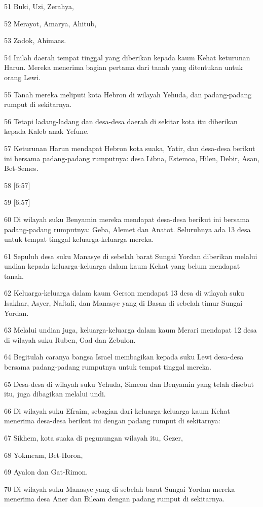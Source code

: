 \par 51 Buki, Uzi, Zerahya,
\par 52 Merayot, Amarya, Ahitub,
\par 53 Zadok, Ahimaas.
\par 54 Inilah daerah tempat tinggal yang diberikan kepada kaum Kehat keturunan Harun. Mereka menerima bagian pertama dari tanah yang ditentukan untuk orang Lewi.
\par 55 Tanah mereka meliputi kota Hebron di wilayah Yehuda, dan padang-padang rumput di sekitarnya.
\par 56 Tetapi ladang-ladang dan desa-desa daerah di sekitar kota itu diberikan kepada Kaleb anak Yefune.
\par 57 Keturunan Harun mendapat Hebron kota suaka, Yatir, dan desa-desa berikut ini bersama padang-padang rumputnya: desa Libna, Estemoa, Hilen, Debir, Asan, Bet-Semes.
\par 58 [6:57]
\par 59 [6:57]
\par 60 Di wilayah suku Benyamin mereka mendapat desa-desa berikut ini bersama padang-padang rumputnya: Geba, Alemet dan Anatot. Seluruhnya ada 13 desa untuk tempat tinggal keluarga-keluarga mereka.
\par 61 Sepuluh desa suku Manasye di sebelah barat Sungai Yordan diberikan melalui undian kepada keluarga-keluarga dalam kaum Kehat yang belum mendapat tanah.
\par 62 Keluarga-keluarga dalam kaum Gerson mendapat 13 desa di wilayah suku Isakhar, Asyer, Naftali, dan Manasye yang di Basan di sebelah timur Sungai Yordan.
\par 63 Melalui undian juga, keluarga-keluarga dalam kaum Merari mendapat 12 desa di wilayah suku Ruben, Gad dan Zebulon.
\par 64 Begitulah caranya bangsa Israel membagikan kepada suku Lewi desa-desa bersama padang-padang rumputnya untuk tempat tinggal mereka.
\par 65 Desa-desa di wilayah suku Yehuda, Simeon dan Benyamin yang telah disebut itu, juga dibagikan melalui undi.
\par 66 Di wilayah suku Efraim, sebagian dari keluarga-keluarga kaum Kehat menerima desa-desa berikut ini dengan padang rumput di sekitarnya:
\par 67 Sikhem, kota suaka di pegunungan wilayah itu, Gezer,
\par 68 Yokmeam, Bet-Horon,
\par 69 Ayalon dan Gat-Rimon.
\par 70 Di wilayah suku Manasye yang di sebelah barat Sungai Yordan mereka menerima desa Aner dan Bileam dengan padang rumput di sekitarnya.
